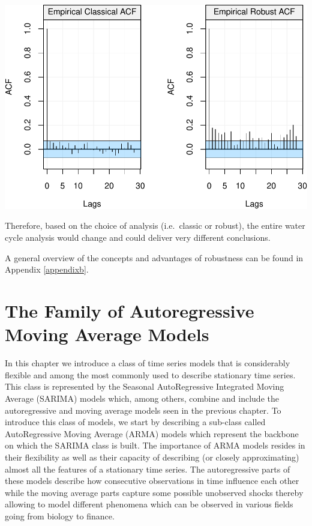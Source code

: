 \documentclass[]{book}
\theoremstyle{definition}
\theoremstyle{definition}
\theoremstyle{definition}
\theoremstyle{remark}
\begin{document}
\includegraphics{ts_files/figure-latex/unnamed-chunk-25-1.pdf}

Therefore, based on the choice of analysis (i.e.~classic or robust), the
entire water cycle analysis would change and could deliver very
different conclusions.

A general overview of the concepts and advantages of robustness can be
found in Appendix \ref{appendixb}.

\hypertarget{the-family-of-autoregressive-moving-average-models}{%
\chapter{The Family of Autoregressive Moving Average
Models}\label{the-family-of-autoregressive-moving-average-models}}

In this chapter we introduce a class of time series models that is
considerably flexible and among the most commonly used to describe
stationary time series. This class is represented by the Seasonal
AutoRegressive Integrated Moving Average (SARIMA) models which, among
others, combine and include the autoregressive and moving average models
seen in the previous chapter. To introduce this class of models, we
start by describing a sub-class called AutoRegressive Moving Average
(ARMA) models which represent the backbone on which the SARIMA class is
built. The importance of ARMA models resides in their flexibility as
well as their capacity of describing (or closely approximating) almost
all the features of a stationary time series. The autoregressive parts
of these models describe how consecutive observations in time influence
each other while the moving average parts capture some possible
unobserved shocks thereby allowing to model different phenomena which
can be observed in various fields going from biology to finance.
\end{document}
